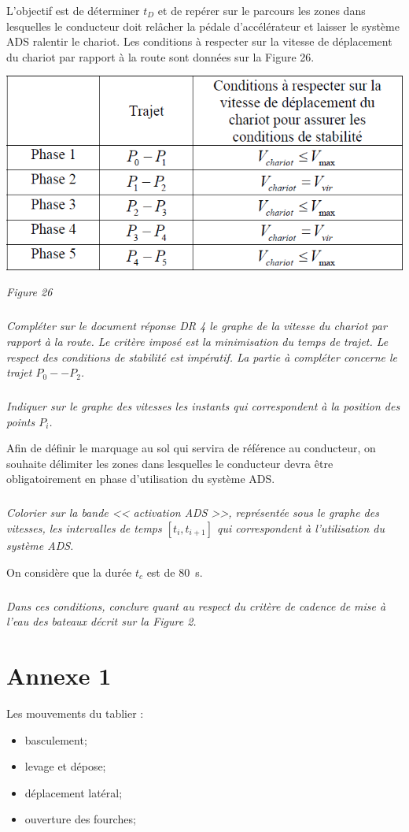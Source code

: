 \documentclass[10pt,fleqn]{article} %
\begin{document}
L’objectif est de déterminer $t_D$ et de repérer sur le parcours les zones dans lesquelles le conducteur doit relâcher la pédale d’accélérateur et laisser le système ADS ralentir le chariot.
Les conditions à respecter sur la vitesse de déplacement du chariot par rapport à la route sont données sur la Figure 26.


\begin{center}
\includegraphics[width=.5\linewidth]{images/fig_26}

\textit{Figure 26}
\end{center}


\subparagraph{}
\textit{Compléter sur le document réponse DR 4 le graphe de la vitesse du chariot par rapport à la route. Le critère imposé est la minimisation du temps de trajet. Le respect des conditions de stabilité est impératif. La partie à compléter concerne le trajet $P_0 -- P_2$.}

\subparagraph{}
\textit{Indiquer sur le graphe des vitesses les instants qui correspondent à la position des points $P_i$.}

Afin de définir le marquage au sol qui servira de référence au conducteur, on souhaite délimiter les zones dans lesquelles le conducteur devra être obligatoirement en phase d’utilisation du système ADS.



\subparagraph{}
\textit{Colorier sur la bande << activation ADS  >>, représentée sous le graphe des vitesses, les intervalles de temps $\left[t_i, t_{i+1}\right]$ qui correspondent à l’utilisation du système ADS.}


On considère que la durée $t_c$ est de \SI{80}{s}.

\subparagraph{}
\textit{Dans ces conditions, conclure quant au respect du critère de cadence de mise à l’eau des bateaux décrit sur la Figure 2.}


\newpage
\section*{Annexe 1}

Les mouvements du tablier :
\begin{itemize}
\item basculement;
\item levage et dépose;
\item déplacement latéral;
\item ouverture des fourches;
\end{itemize}
\end{document}
